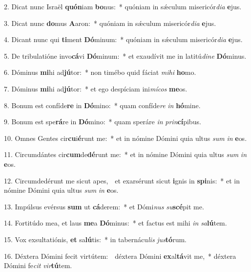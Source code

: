 
2. Dicat nunc Israël \textbf{quón}iam \textbf{bo}nus:~* quóniam in s\'{\ae}culum misericór\textit{di}\textit{a} \textbf{e}jus.

3. Dicat nunc \textbf{do}mus \textbf{A}aron:~* quóniam in s\'{\ae}culum misericór\textit{di}\textit{a} \textbf{e}jus.

4. Dicant nunc qui \textbf{ti}ment \textbf{Dó}minum:~* quóniam in s\'{\ae}culum misericór\textit{di}\textit{a} \textbf{e}jus.

5. De tribulatióne invo\textbf{cá}vi \textbf{Dó}minum:~* et exaudívit me in latitú\textit{di}\textit{ne} \textbf{Dó}minus.

6. Dóminus \textbf{mi}hi ad\textbf{jú}tor:~* non timébo quid fáciat \textit{mi}\textit{hi} \textbf{ho}mo.

7. Dóminus \textbf{mi}hi ad\textbf{jú}tor:~* et ego despíciam ini\textit{mí}\textit{cos} \textbf{me}os.

8. Bonum est confíde\textbf{re} in \textbf{Dó}mino:~* quam confíde\textit{re} \textit{in} \textbf{hó}mine.

9. Bonum est spe\textbf{rá}re in \textbf{Dó}mino:~* quam speráre \textit{in} \textit{prin}\textbf{cí}pibus.

10. Omnes Gentes cir\textbf{cu}i\textbf{é}runt me:~* et in nómine Dómini quia ultus \textit{sum} \textit{in} \textbf{e}os.

11. Circumdántes cir\textbf{cum}de\textbf{dé}runt me:~* et in nómine Dómini quia ultus \textit{sum} \textit{in} \textbf{e}os.

12. Circumdedérunt me sicut apes,~\GreDagger\ et exarsérunt sicut \textbf{i}gnis in \textbf{spi}nis:~* et in nómine Dómini quia ultus \textit{sum} \textit{in} \textbf{e}os.

13. Impúlsus evérsus \textbf{sum} ut \textbf{cá}derem:~* et Dómi\textit{nus} \textit{su}\textbf{scé}pit me.

14. Fortitúdo mea, et laus \textbf{me}a \textbf{Dó}minus:~* et factus est mihi \textit{in} \textit{sa}\textbf{lú}tem.

15. Vox exsultatiónis, \textbf{et} sa\textbf{lú}tis:~* in tabernácu\textit{lis} \textit{jus}\textbf{tó}rum.

16. Déxtera Dómini fecit virtútem:~\GreDagger\ déxtera Dómini \textbf{ex}al\textbf{tá}vit me,~* déxtera Dómini fe\textit{cit} \textit{vir}\textbf{tú}tem.

